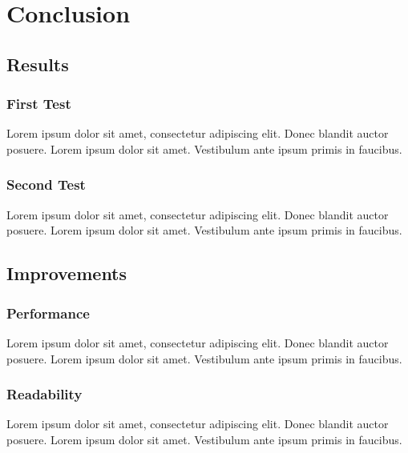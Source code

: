 \section{Conclusion}


\subsection{Results}


\begin{frame}
	\frametitle{First Test}
	Lorem ipsum dolor sit amet, consectetur adipiscing elit. Donec blandit auctor posuere. Lorem ipsum dolor sit amet. Vestibulum ante ipsum primis in faucibus.
\end{frame}


\begin{frame}
	\frametitle{Second Test}
	Lorem ipsum dolor sit amet, consectetur adipiscing elit. Donec blandit auctor posuere. Lorem ipsum dolor sit amet. Vestibulum ante ipsum primis in faucibus.
\end{frame}


\subsection{Improvements}


\begin{frame}
	\frametitle{Performance}
	Lorem ipsum dolor sit amet, consectetur adipiscing elit. Donec blandit auctor posuere. Lorem ipsum dolor sit amet. Vestibulum ante ipsum primis in faucibus.
\end{frame}


\begin{frame}
	\frametitle{Readability}
	Lorem ipsum dolor sit amet, consectetur adipiscing elit. Donec blandit auctor posuere. Lorem ipsum dolor sit amet. Vestibulum ante ipsum primis in faucibus.
\end{frame}
